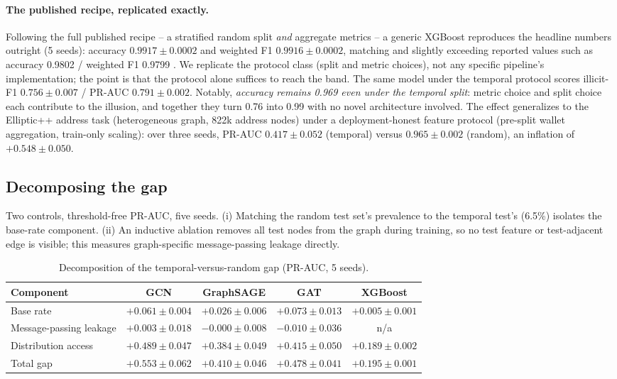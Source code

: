 \documentclass[11pt]{article}
\begin{document}
\paragraph{The published recipe, replicated exactly.} Following the full published
recipe -- a stratified random split \emph{and} aggregate metrics -- a generic
XGBoost reproduces the headline numbers outright (5 seeds): accuracy
$0.9917\pm0.0002$ and weighted F1 $0.9916\pm0.0002$, matching and slightly
exceeding reported values such as accuracy 0.9802 / weighted F1 0.9799
\citep{lin2026wavelet}. We replicate the protocol class (split and metric
choices), not any specific pipeline's implementation; the point is that the
protocol alone suffices to reach the band. The same
model under the temporal protocol scores illicit-F1 $0.756\pm0.007$ / PR-AUC
$0.791\pm0.002$. Notably, \emph{accuracy remains 0.969 even under the temporal
split}: metric choice and split choice each contribute to the illusion, and
together they turn 0.76 into 0.99 with no novel architecture involved. The effect
generalizes to the Elliptic++ address task (heterogeneous graph, 822k address
nodes) under a deployment-honest feature protocol (pre-split wallet aggregation,
train-only scaling): over three seeds, PR-AUC $0.417\pm0.052$ (temporal) versus
$0.965\pm0.002$ (random), an inflation of $+0.548\pm0.050$.

\subsection{Decomposing the gap}
\label{sec:decompose}
Two controls, threshold-free PR-AUC, five seeds. (i) Matching the random test
set's prevalence to the temporal test's (6.5\%) isolates the base-rate component.
(ii) An inductive ablation removes all test nodes from the graph during training,
so no test feature or test-adjacent edge is visible; this measures graph-specific
message-passing leakage directly.

\begin{table}[h]
\centering
\caption{Decomposition of the temporal-versus-random gap (PR-AUC, 5 seeds).}
\label{tab:decompose}
\begin{tabular}{lcccc}
\toprule
Component & GCN & GraphSAGE & GAT & XGBoost \\
\midrule
Base rate & $+0.061\pm0.004$ & $+0.026\pm0.006$ & $+0.073\pm0.013$ & $+0.005\pm0.001$ \\
Message-passing leakage & $+0.003\pm0.018$ & $-0.000\pm0.008$ & $-0.010\pm0.036$ & n/a \\
Distribution access & $+0.489\pm0.047$ & $+0.384\pm0.049$ & $+0.415\pm0.050$ & $+0.189\pm0.002$ \\
\midrule
Total gap & $+0.553\pm0.062$ & $+0.410\pm0.046$ & $+0.478\pm0.041$ & $+0.195\pm0.001$ \\
\bottomrule
\end{tabular}
\end{table}
\end{document}
